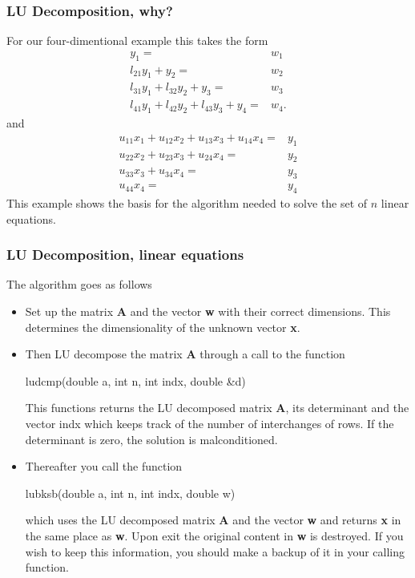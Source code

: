 \documentclass[compress]{beamer}
\begin{document}
\frame
{
  \frametitle{LU Decomposition, why?}
\begin{small}
{\scriptsize
For our four-dimentional example this takes the form
%
\begin{eqnarray}
 y_1=&w_1 \nonumber\\
l_{21}y_1 + y_2=&w_2\nonumber \\
l_{31}y_1 + l_{32}y_2 + y_3 =&w_3\nonumber \\
l_{41}y_1 + l_{42}y_2 + l_{43}y_3 + y_4=&w_4. \nonumber
\end{eqnarray}
%
and
%
\begin{eqnarray}
 u_{11}x_1 +u_{12}x_2 +u_{13}x_3 + u_{14}x_4=&y_1 \nonumber\\
u_{22}x_2 + u_{23}x_3 + u_{24}x_4=&y_2\nonumber \\
u_{33}x_3 + u_{34}x_4=&y_3\nonumber \\
u_{44}x_4=&y_4  \nonumber
\end{eqnarray}
%
This example shows the basis for the algorithm
needed to solve the set of $n$ linear equations.
}
\end{small}
}


\frame
{
  \frametitle{LU Decomposition, linear equations}
\begin{small}
{\scriptsize
The algorithm goes as follows
%
\begin{itemize}
\item Set up the matrix {\bf A} and the vector {\bf w}
      with their correct dimensions. This determines the dimensionality
      of the unknown vector {\bf x}.
\item Then LU decompose the matrix {\bf A} through a call to
      the function
      \begin{center}
         ludcmp(double a, int n, int indx, double \&d)
      \end{center}
      This functions returns the LU decomposed
      matrix {\bf A}, its determinant and the vector indx which keeps track
     of the number of interchanges of  rows. If the determinant is zero,
     the solution is malconditioned.
\item Thereafter you call the function
      \begin{center}
       lubksb(double a, int n, int indx, double w)
      \end{center}
      which uses the
      LU decomposed matrix {\bf A} and the vector {\bf w} and returns {\bf x}
      in the same place as {\bf w}. Upon exit the original content
      in {\bf w} is destroyed. If you wish to keep this information, you should make
      a backup of it in your calling function.
\end{itemize}
}
\end{small}
}
\end{document}
